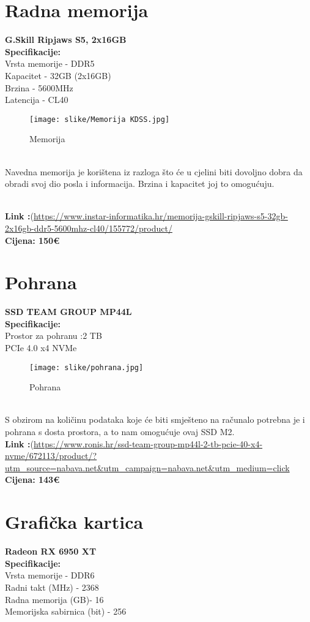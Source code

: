 \documentclass{article}
\begin{document}
\section{Radna memorija}
\textbf{G.Skill Ripjaws S5, 2x16GB}
\\ \textbf{Specifikacije:}
\\Vrsta memorije - DDR5
\\Kapacitet	- 32GB (2x16GB)
\\Brzina - 5600MHz
\\Latencija - CL40
\begin{figure}[h!]
    \centering
    \texttt{[image: slike/Memorija KDSS.jpg]}
    \caption{Memorija}
    \label{fig:method}
\end{figure}
\\
Navedna memorija je korištena iz razloga što će u cjelini biti dovoljno dobra da obradi svoj dio posla i informacija. Brzina i kapacitet joj to omogućuju.

\\ \textbf{Link :}(\url{https://www.instar-informatika.hr/memorija-gskill-ripjaws-s5-32gb-2x16gb-ddr5-5600mhz-cl40/155772/product/}
\\ \textbf{Cijena: 150€}

\newpage
\section{Pohrana}
\textbf{SSD TEAM GROUP MP44L}
\\ \textbf{Specifikacije:}
\\ Prostor za pohranu :2 TB
\\ PCIe 4.0 x4 NVMe

\begin{figure}[h!]
    \centering
    \texttt{[image: slike/pohrana.jpg]}
    \caption{Pohrana}
    \label{fig:method}
\end{figure}
\\ S obzirom na količinu podataka koje će biti smješteno na računalo potrebna je i pohrana s dosta prostora, a to nam omogućuje ovaj SSD M2. 
\\ \textbf{Link :}(\url{https://www.ronis.hr/ssd-team-group-mp44l-2-tb-pcie-40-x4-nvme/672113/product/?utm_source=nabava.net&utm_campaign=nabava.net&utm_medium=click}
\\ \textbf{Cijena: 143€}

\newpage
\section{Grafička kartica}
\textbf{Radeon RX 6950 XT}
\\ \textbf{Specifikacije:}
\\ Vrsta memorije - DDR6
\\ Radni takt (MHz)	- 2368
\\ Radna memorija (GB)- 16
\\ Memorijska sabirnica (bit) - 256
\end{document}
